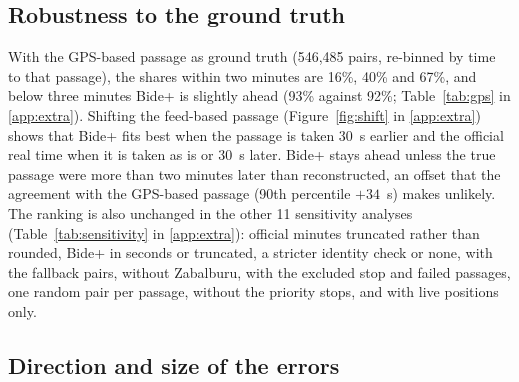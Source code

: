 \subsection{Robustness to the ground truth}

With the GPS-based passage as ground truth (546,485 pairs, re-binned by time to that passage), the shares within two
minutes are 16\%, 40\% and 67\%, and below three minutes Bide+ is slightly ahead (93\% against 92\%; Table~\ref{tab:gps} in \ref{app:extra}). Shifting the feed-based passage
(Figure~\ref{fig:shift} in \ref{app:extra}) shows that Bide+ fits best when the passage is taken 30~s earlier and the
official real time when it is taken as is or 30~s later. Bide+ stays ahead unless the true passage were more than two minutes later than
reconstructed, an offset that the agreement with the GPS-based passage (90th percentile $+34$~s) makes unlikely. The ranking is also unchanged in the
other 11 sensitivity analyses (Table~\ref{tab:sensitivity} in \ref{app:extra}): official minutes truncated rather than
rounded, Bide+ in seconds or truncated, a stricter identity check or none, with the fallback pairs, without Zabalburu, with
the excluded stop and failed passages, one random pair per passage, without the priority stops, and with live positions
only.

\subsection{Direction and size of the errors}
\label{sec:tails}


